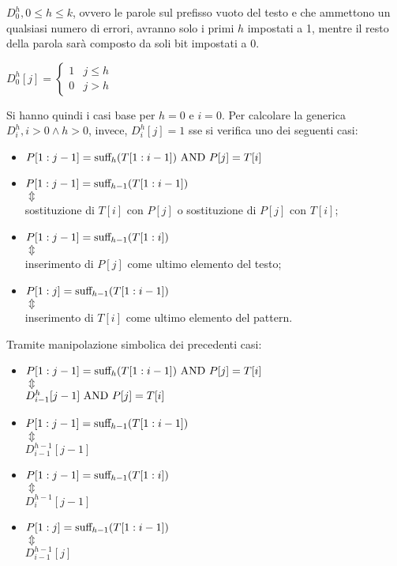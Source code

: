 $D_0^h, 0 \le h \le k$, ovvero le parole sul prefisso vuoto del testo e che ammettono un qualsiasi numero di errori, avranno solo i primi $h$ impostati a 1, mentre il resto della parola sarà composto da soli bit impostati a 0.
\begin{center}
    $D_0^h[j] = \begin{cases}
        1 & j \le h \\
        0 & j > h
    \end{cases}$
\end{center}
Si hanno quindi i casi base per $h = 0$ e $i = 0$.
Per calcolare la generica $D_i^h, i > 0 \land h > 0$, invece, $D_i^h[j] = 1$ sse si verifica uno dei seguenti casi:
\begin{itemize}
    \item $P[1:j-1] = \textnormal{suff}_h(T[1:i-1]) \textnormal{ AND } P[j] = T[i]$
    \item $P[1:j-1] = \textnormal{suff}_{h-1}(T[1:i-1])$\\
        $\Updownarrow$ \\
        sostituzione di $T[i]$ con $P[j]$ o sostituzione di $P[j]$ con $T[i]$;
    \item $P[1:j-1] = \textnormal{suff}_{h-1}(T[1:i])$ \\
    $\Updownarrow$ \\
    inserimento di $P[j]$ come ultimo elemento del testo;
    \item $P[1:j] = \textnormal{suff}_{h-1}(T[1:i-1])$ \\
    $\Updownarrow$ \\
    inserimento di $T[i]$ come ultimo elemento del pattern.
\end{itemize}
Tramite manipolazione simbolica dei precedenti casi:
\begin{itemize}
    \item $P[1:j-1] = \textnormal{suff}_h(T[1:i-1]) \textnormal{ AND } P[j] = T[i]$ \\
    $\Updownarrow$ \\
    $D_{i-1}^h[j-1] \textnormal{ AND } P[j] = T[i]$
    \item $P[1:j-1] = \textnormal{suff}_{h-1}(T[1:i-1])$\\
    $\Updownarrow$ \\
    $D_{i-1}^{h-1}[j-1]$
    \item $P[1:j-1] = \textnormal{suff}_{h-1}(T[1:i])$\\
    $\Updownarrow$\\
    $D_i^{h-1}[j-1]$
    \item $P[1:j] = \textnormal{suff}_{h-1}(T[1:i-1])$\\
    $\Updownarrow$\\
    $D_{i-1}^{h-1}[j]$
\end{itemize}

